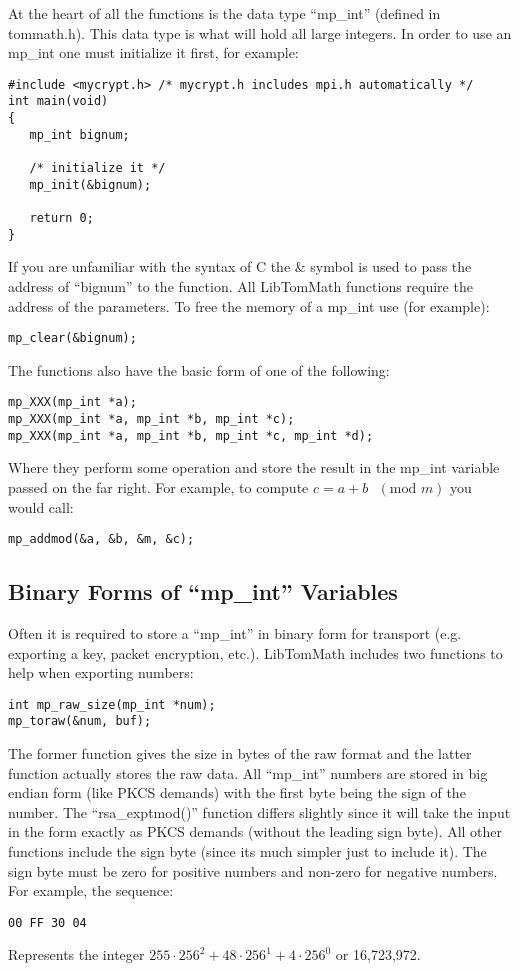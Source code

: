 \documentclass{book}
\begin{document}
At the heart of all the functions is the data type ``mp\_int'' (defined in tommath.h).  This data type is what 
will hold all large integers.  In order to use an mp\_int one must initialize it first, for example:
\begin{verbatim}
#include <mycrypt.h> /* mycrypt.h includes mpi.h automatically */
int main(void)
{ 
   mp_int bignum;
   
   /* initialize it */
   mp_init(&bignum);

   return 0;
}
\end{verbatim}
If you are unfamiliar with the syntax of C the \& symbol is used to pass the address of ``bignum'' to the function.  All
LibTomMath functions require the address of the parameters.  To free the memory of a mp\_int use (for example):
\begin{verbatim}
mp_clear(&bignum);
\end{verbatim}

The functions also have the basic form of one of the following:
\begin{verbatim}
mp_XXX(mp_int *a);
mp_XXX(mp_int *a, mp_int *b, mp_int *c);
mp_XXX(mp_int *a, mp_int *b, mp_int *c, mp_int *d);
\end{verbatim}

Where they perform some operation and store the result in the mp\_int variable passed on the far right.  
For example, to compute $c = a + b \mbox{ }(\mbox{mod }m)$ you would call:
\begin{verbatim}
mp_addmod(&a, &b, &m, &c);
\end{verbatim}

\subsection{Binary Forms of ``mp\_int'' Variables}

Often it is required to store a ``mp\_int'' in binary form for transport (e.g. exporting a key, packet 
encryption, etc.).  LibTomMath includes two functions to help when exporting numbers:
\begin{verbatim}
int mp_raw_size(mp_int *num);
mp_toraw(&num, buf);
\end{verbatim}

The former function gives the size in bytes of the raw format and the latter function actually stores the raw data.  All
``mp\_int'' numbers are stored in big endian form (like PKCS demands) with the first byte being the sign of the number.  The
``rsa\_exptmod()'' function differs slightly since it will take the input in the form exactly as PKCS demands (without the
leading sign byte).  All other functions include the sign byte (since its much simpler just to include it).  The sign byte
must be zero for positive numbers and non-zero for negative numbers.  For example,
the sequence:
\begin{verbatim}
00 FF 30 04
\end{verbatim}
Represents the integer $255 \cdot 256^2 + 48 \cdot 256^1 + 4 \cdot 256^0$ or 16,723,972.
\end{document}
